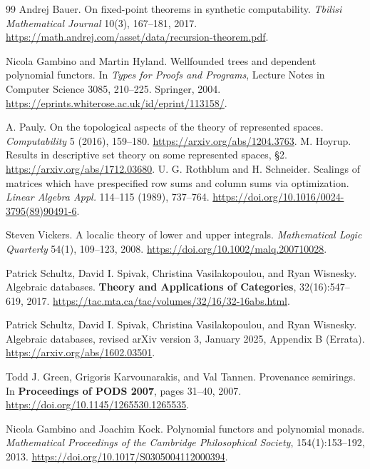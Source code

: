\documentclass[11pt,a4paper]{article}
\theoremstyle{definition}
\theoremstyle{remark}\newaliascnt{remark}{theorem}
\numberwithin{equation}{section}
\begin{document}
\begin{thebibliography}{99}
 Andrej Bauer. On fixed-point theorems in synthetic computability. \emph{Tbilisi Mathematical Journal} 10(3), 167--181, 2017. \url{https://math.andrej.com/asset/data/recursion-theorem.pdf}.

 Nicola Gambino and Martin Hyland. Wellfounded trees and dependent polynomial functors. In \emph{Types for Proofs and Programs}, Lecture Notes in Computer Science 3085, 210--225. Springer, 2004. \url{https://eprints.whiterose.ac.uk/id/eprint/113158/}.

 A. Pauly. On the topological aspects of the theory of represented spaces. \emph{Computability} 5 (2016), 159--180. \url{https://arxiv.org/abs/1204.3763}.
 M. Hoyrup. Results in descriptive set theory on some represented spaces, \S2. \url{https://arxiv.org/abs/1712.03680}.
 U. G. Rothblum and H. Schneider. Scalings of matrices which have prespecified row sums and column sums via optimization. \emph{Linear Algebra Appl.} 114--115 (1989), 737--764. \url{https://doi.org/10.1016/0024-3795(89)90491-6}.

 Steven Vickers. A localic theory of lower and upper integrals. \emph{Mathematical Logic Quarterly} 54(1), 109--123, 2008. \url{https://doi.org/10.1002/malq.200710028}.

Patrick Schultz, David I. Spivak, Christina Vasilakopoulou, and Ryan Wisnesky.
\newblock Algebraic databases.
\newblock \textbf{Theory and Applications of Categories}, 32(16):547--619, 2017.
\newblock \url{https://tac.mta.ca/tac/volumes/32/16/32-16abs.html}.

Patrick Schultz, David I. Spivak, Christina Vasilakopoulou, and Ryan Wisnesky.
\newblock Algebraic databases, revised arXiv version 3, January 2025, Appendix B (Errata).
\newblock \url{https://arxiv.org/abs/1602.03501}.

Todd J. Green, Grigoris Karvounarakis, and Val Tannen.
\newblock Provenance semirings.
\newblock In \textbf{Proceedings of PODS 2007}, pages 31--40, 2007.
\newblock \url{https://doi.org/10.1145/1265530.1265535}.

Nicola Gambino and Joachim Kock.
\newblock Polynomial functors and polynomial monads.
\newblock \emph{Mathematical Proceedings of the Cambridge Philosophical Society},
154(1):153--192, 2013.
\newblock \url{https://doi.org/10.1017/S0305004112000394}.


\end{thebibliography}
\end{document}
